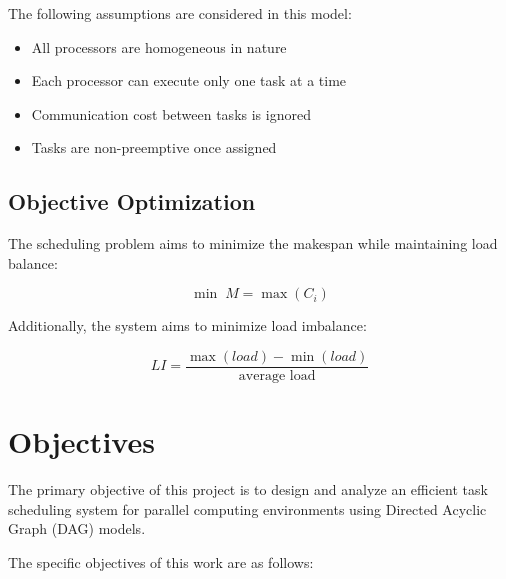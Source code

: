 \documentclass[12pt,a4paper]{article}
\begin{document}
The following assumptions are considered in this model:

\begin{itemize}
\item All processors are homogeneous in nature
\item Each processor can execute only one task at a time
\item Communication cost between tasks is ignored
\item Tasks are non-preemptive once assigned
\end{itemize}

\subsection*{Objective Optimization}

The scheduling problem aims to minimize the makespan while maintaining load balance:

\[
\min \; M = \max(C_i)
\]

Additionally, the system aims to minimize load imbalance:

\[
LI = \frac{\max(load) - \min(load)}{\text{average load}}
\]
%	
%	
	\section{Objectives}

The primary objective of this project is to design and analyze an efficient task scheduling system for parallel computing environments using Directed Acyclic Graph (DAG) models.

The specific objectives of this work are as follows:
\end{document}
